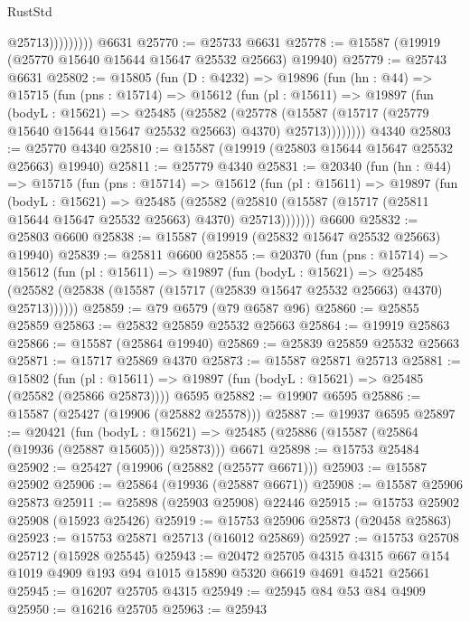 \begin{lexlean}{RustStd}
\begin{coremodule}
                      @25713)))))))))
    @6631
@25770 := @25733 @6631
@25778 := @15587 (@19919 (@25770 @15640 @15644 @15647 @25532 @25663) @19940)
@25779 := @25743 @6631
@25802 := @15805
    (fun (D : @4232) =>
    @19896
      (fun (hn : @44) =>
      @15715
        (fun (pns : @15714) =>
        @15612
          (fun (pl : @15611) =>
          @19897
            (fun (bodyL : @15621) =>
            @25485
              (@25582
                (@25778
                  (@15587 (@15717 (@25779 @15640 @15644 @15647 @25532 @25663) @4370) @25713))))))))
    @4340
@25803 := @25770 @4340
@25810 := @15587 (@19919 (@25803 @15644 @15647 @25532 @25663) @19940)
@25811 := @25779 @4340
@25831 := @20340
    (fun (hn : @44) =>
    @15715
      (fun (pns : @15714) =>
      @15612
        (fun (pl : @15611) =>
        @19897
          (fun (bodyL : @15621) =>
          @25485
            (@25582
              (@25810 (@15587 (@15717 (@25811 @15644 @15647 @25532 @25663) @4370) @25713)))))))
    @6600
@25832 := @25803 @6600
@25838 := @15587 (@19919 (@25832 @15647 @25532 @25663) @19940)
@25839 := @25811 @6600
@25855 := @20370
    (fun (pns : @15714) =>
    @15612
      (fun (pl : @15611) =>
      @19897
        (fun (bodyL : @15621) =>
        @25485 (@25582 (@25838 (@15587 (@15717 (@25839 @15647 @25532 @25663) @4370) @25713))))))
@25859 := @79 @6579 (@79 @6587 @96)
@25860 := @25855 @25859
@25863 := @25832 @25859 @25532 @25663
@25864 := @19919 @25863
@25866 := @15587 (@25864 @19940)
@25869 := @25839 @25859 @25532 @25663
@25871 := @15717 @25869 @4370
@25873 := @15587 @25871 @25713
@25881 := @15802
    (fun (pl : @15611) => @19897 (fun (bodyL : @15621) => @25485 (@25582 (@25866 @25873))))
    @6595
@25882 := @19907 @6595
@25886 := @15587 (@25427 (@19906 (@25882 @25578)))
@25887 := @19937 @6595
@25897 := @20421
    (fun (bodyL : @15621) => @25485 (@25886 (@15587 (@25864 (@19936 (@25887 @15605))) @25873)))
    @6671
@25898 := @15753 @25484
@25902 := @25427 (@19906 (@25882 (@25577 @6671)))
@25903 := @15587 @25902
@25906 := @25864 (@19936 (@25887 @6671))
@25908 := @15587 @25906 @25873
@25911 := @25898 (@25903 @25908) @22446
@25915 := @15753 @25902 @25908 (@15923 @25426)
@25919 := @15753 @25906 @25873 (@20458 @25863)
@25923 := @15753 @25871 @25713 (@16012 @25869)
@25927 := @15753 @25708 @25712 (@15928 @25545)
@25943 := @20472
    @25705
    @4315
    @4315
    @667
    @154
    @1019
    @4909
    @193
    @94
    @1015
    @15890
    @5320
    @6619
    @4691
    @4521
    @25661
@25945 := @16207 @25705 @4315
@25949 := @25945 @84 @53 @84 @4909
@25950 := @16216 @25705
@25963 := @25943

\end{coremodule}
\end{lexlean}
